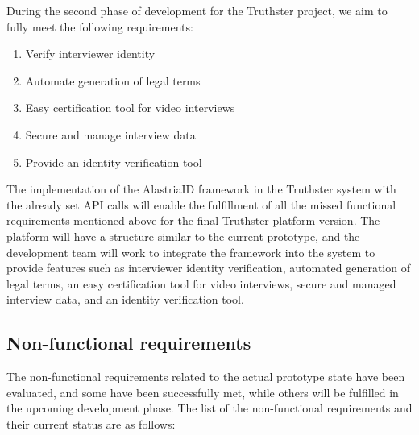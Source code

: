 \documentclass[target=mst,aauheader=]{thud}
\begin{document}
    During the second phase of development for the Truthster project, we aim to fully meet the following requirements:

    \begin{enumerate}

        \item Verify interviewer identity
        \item Automate generation of legal terms
        \item Easy certification tool for video interviews
        \item Secure and manage interview data
        \item Provide an identity verification tool

    \end{enumerate}

The implementation of the AlastriaID framework in the Truthster system with the already set API calls will enable the fulfillment of all the missed functional requirements mentioned above for the final Truthster platform version. The platform will have a structure similar to the current prototype, and the development team will work to integrate the framework into the system to provide features such as interviewer identity verification, automated generation of legal terms, an easy certification tool for video interviews, secure and managed interview data, and an identity verification tool.


\subsection{Non-functional requirements}

The non-functional requirements related to the actual prototype state have been evaluated, and some have been successfully met, while others will be fulfilled in the upcoming development phase. The list of the non-functional requirements and their current status are as follows:
\end{document}
